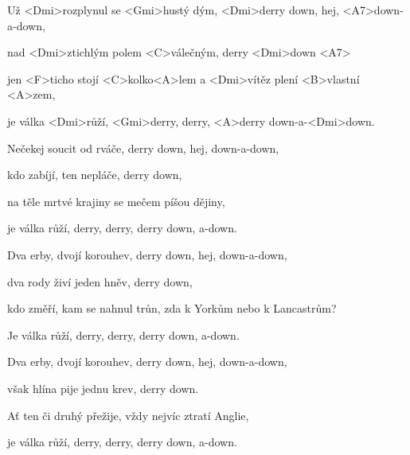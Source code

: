 
\zs
Už <Dmi>rozplynul se <Gmi>hustý dým, <Dmi>derry down, hej, <A7>down-a-down, 

nad <Dmi>ztichlým polem <C>válečným, derry <Dmi>down <A7> 

jen <F>ticho stojí <C>kolko<A>lem a <Dmi>vítěz plení <B>vlastní <A>zem, 

je válka <Dmi>růží, <Gmi>derry, derry, <A>derry down-a-<Dmi>down. \ks

\zs
Nečekej soucit od rváče, derry down, hej, down-a-down, 

kdo zabíjí, ten nepláče, derry down, 

na těle mrtvé krajiny se mečem píšou dějiny, 

je válka růží, derry, derry, derry down, a-down.
\ks

\zs
Dva erby, dvojí korouhev, derry down, hej, down-a-down, 

dva rody živí jeden hněv, derry down, 

kdo změří, kam se nahnul trůn, zda k Yorkům nebo k Lancastrům?

Je válka růží, derry, derry, derry down, a-down.
\ks

\zs
Dva erby, dvojí korouhev, derry down, hej, down-a-down, 

však hlína pije jednu krev, derry down.

Ať ten či druhý přežije, vždy nejvíc ztratí Anglie, 

je válka růží, derry, derry, derry down, a-down.
\ks
\kp

